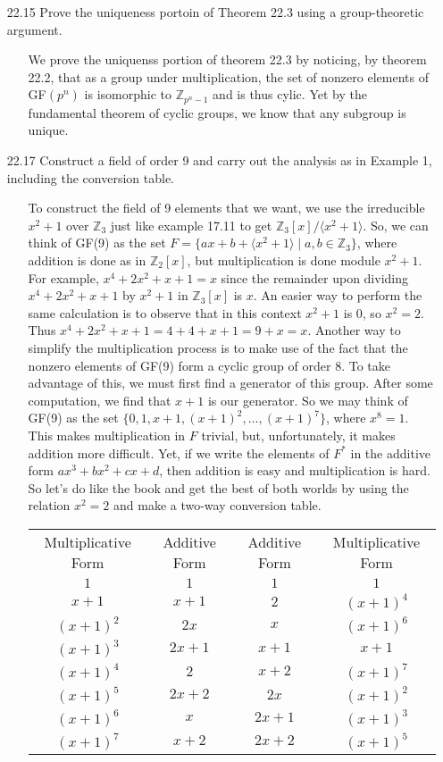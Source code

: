 \documentclass[12pt]{article}
\begin{document}
\begin{enumerate}
\item[22.15] Prove the uniqueness portoin of Theorem 22.3 using a group-theoretic argument.
\begin{enumerate}
\item[] We prove the uniquenss portion of theorem 22.3 by noticing, by theorem
22.2, that as a group under multiplication, the set of nonzero elements of GF$(p^n)$ is
isomorphic to $\mathbb{Z}_{p^n-1}$ and is thus cylic. Yet by the fundamental theorem of cyclic
groups, we know that any subgroup is unique. 
\end{enumerate}

\item[22.17] Construct a field of order 9 and carry out the analysis as in Example 1, including
the conversion table.
\begin{enumerate}
\item[] To construct the field of 9 elements that we want, we use the irreducible $x^2 + 1$
over $\mathbb{Z}_3$ just like example 17.11 to get $\mathbb{Z}_3[x]/\langle x^2 + 1\rangle$.
So, we can think of GF(9) as the set 
$F = \{ ax + b + \langle x^2 + 1\rangle \mid a, b \in \mathbb{Z}_3\}$, 
where addition is done as in $\mathbb{Z}_2[x]$, but
multiplication is done module $x^2 + 1$. For example, $x^4 + 2x^2 + x + 1 = x$ since the
remainder upon dividing $x^4 + 2x^2 + x + 1$ by $x^2 + 1$ in $\mathbb{Z}_3[x]$ is $x$. An easier
way to perform the same calculation is to observe that in this context $x^2 + 1$ is 0, so 
$x^2 = 2$. Thus $x^4 + 2x^2 + x + 1 = 4 + 4 + x + 1 = 9 + x = x$. Another way to simplify the
multiplication process is to make use of the fact that the nonzero elements of GF(9) form
a cyclic group of order 8. To take advantage of this, we must first find a generator of this group.
After some computation, we find that $x + 1$ is our generator. So we may think of GF(9) as
the set $\{0, 1, x + 1, (x + 1)^2, \ldots, (x + 1)^7 \}$, where $x^8 = 1$. This makes multiplication
in $F$ trivial, but, unfortunately, it makes addition more difficult. Yet, if we write the elements
of $F^*$ in the additive form $ax^3 + bx^2 + cx + d$, then addition is easy and multiplication
is hard. So let's do like the book and get the best of both worlds by using the relation $x^2 = 2$ 
and make a two-way conversion table. \\
\begin{tabular}{cc|cc}
\hline
Multiplicative Form&Additive Form&Additive Form&Multiplicative Form\\
$1$ & $1$ & $1$ & $1$ \\
$x + 1$ & $x + 1$ & $2$ & $(x + 1)^4$ \\
$(x + 1)^2$ & $2x$ & $x$ & $(x + 1)^6$ \\
$(x + 1)^3$ & $2x + 1$ & $x + 1$ & $x + 1$ \\
$(x + 1)^4$ & $2$ & $x + 2$ & $(x + 1)^7$ \\
$(x + 1)^5$ & $2x + 2$ & $2x$ & $(x + 1)^2$ \\
$(x + 1)^6$ & $x$ & $2x + 1$ & $(x + 1)^3$ \\
$(x + 1)^7$ & $x + 2$ & $2x + 2$ & $(x + 1)^5$
\end{tabular}
\end{enumerate}


\end{enumerate}
\end{document}
